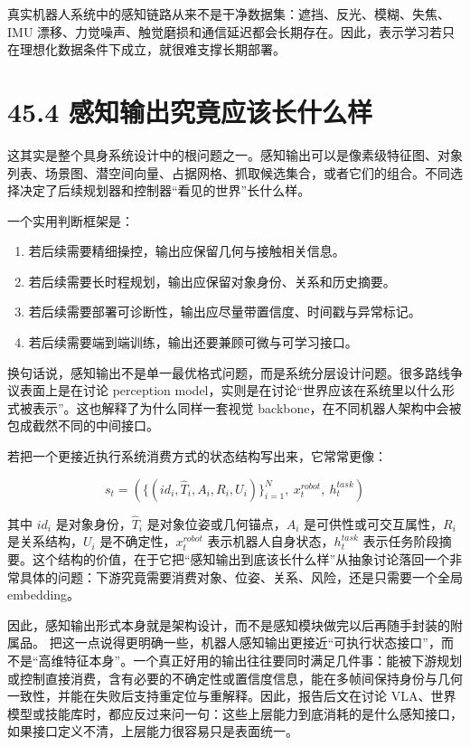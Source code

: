真实机器人系统中的感知链路从来不是干净数据集：遮挡、反光、模糊、失焦、IMU 漂移、力觉噪声、触觉磨损和通信延迟都会长期存在。因此，表示学习若只在理想化数据条件下成立，就很难支撑长期部署。

\section*{45.4 感知输出究竟应该长什么样}


这其实是整个具身系统设计中的根问题之一。感知输出可以是像素级特征图、对象列表、场景图、潜空间向量、占据网格、抓取候选集合，或者它们的组合。不同选择决定了后续规划器和控制器“看见的世界”长什么样。

一个实用判断框架是：

\begin{enumerate}
\item 若后续需要精细操控，输出应保留几何与接触相关信息。
\item 若后续需要长时程规划，输出应保留对象身份、关系和历史摘要。
\item 若后续需要部署可诊断性，输出应尽量带置信度、时间戳与异常标记。
\item 若后续需要端到端训练，输出还要兼顾可微与可学习接口。
\end{enumerate}

换句话说，感知输出不是单一最优格式问题，而是系统分层设计问题。很多路线争议表面上是在讨论 perception model，实则是在讨论“世界应该在系统里以什么形式被表示”。这也解释了为什么同样一套视觉 backbone，在不同机器人架构中会被包成截然不同的中间接口。

若把一个更接近执行系统消费方式的状态结构写出来，它常常更像：

\begingroup
\scriptsize
\begin{equation*}
s_t = \left(\{(id_i, \hat{T}_i, A_i, R_i, U_i)\}_{i=1}^{N},\ x_t^{robot},\ h_t^{task}\right)
\end{equation*}
\endgroup

其中 \(id_i\) 是对象身份，\(\hat{T}_i\) 是对象位姿或几何锚点，\(A_i\) 是可供性或可交互属性，\(R_i\) 是关系结构，\(U_i\) 是不确定性，\(x_t^{robot}\) 表示机器人自身状态，\(h_t^{task}\) 表示任务阶段摘要。这个结构的价值，在于它把“感知输出到底该长什么样”从抽象讨论落回一个非常具体的问题：下游究竟需要消费对象、位姿、关系、风险，还是只需要一个全局 embedding。

因此，感知输出形式本身就是架构设计，而不是感知模块做完以后再随手封装的附属品。 把这一点说得更明确一些，机器人感知输出更接近“可执行状态接口”，而不是“高维特征本身”。一个真正好用的输出往往要同时满足几件事：能被下游规划或控制直接消费，含有必要的不确定性或置信度信息，能在多帧间保持身份与几何一致性，并能在失败后支持重定位与重解释。因此，报告后文在讨论 VLA、世界模型或技能库时，都应反过来问一句：这些上层能力到底消耗的是什么感知接口，如果接口定义不清，上层能力很容易只是表面统一。

